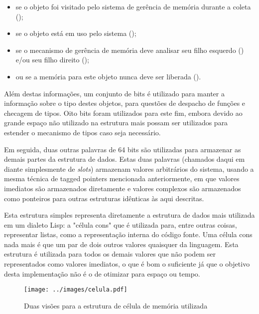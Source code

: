 \begin{itemize}

\item se o objeto foi visitado pelo sistema de gerência de memória durante a
coleta ();

\item  se o objeto está em uso pelo sistema ();

\item  se o mecanismo de gerência de memória deve analisar seu filho esquerdo
() e/ou seu filho direito
();

\item  ou se a memória para este objeto nunca deve ser liberada
().

\end{itemize}

Além destas informações, um conjunto de bits é utilizado para manter a
informação sobre o tipo destes objetos, para questões de despacho de funções e
checagem de tipos. Oito bits foram utilizados para este fim, embora devido ao
grande espaço não utilizado na estrutura mais possam ser utilizados para
estender o mecanismo de tipos caso seja necessário.

Em seguida, duas outras palavras de 64 bits são utilizadas para armazenar as
demais partes da estrutura de dados. Estas duas palavras (chamados daqui em diante
simplesmente de  \textit{slots}) armazenam valores arbitrários do sistema, usando a mesma técnica
de tagged pointers mencionada anteriormente, em que valores imediatos são
armazenados diretamente e valores complexos são armazenados como ponteiros para
outras estruturas idênticas às aqui descritas. 

Esta estrutura simples representa diretamente a estrutura de dados mais
utilizada em um dialeto Lisp: a "célula cons" que é utilizada para, entre
outras coisas, representar listas, como a representação interna do código
fonte. Uma célula cons nada mais é que um par de dois outros valores quaisquer
da linguagem. Esta estrutura é utilizada para todos os demais valores que não
podem ser representados como valores imediatos, o que é bom o suficiente já que
o objetivo desta implementação não é o de otimizar para espaço ou tempo.

\begin{figure}[h!]
\centering
\texttt{[image: ../images/celula.pdf]}
\caption{Duas visões para a estrutura de célula de memória utilizada}
\label{fig:celula}
\end{figure}



